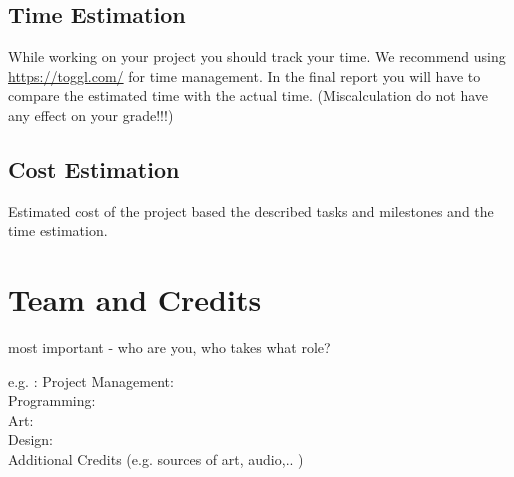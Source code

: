 \documentclass[a4paper]{scrreprt}
\begin{document}
\section{Time Estimation}

While working on your project you should track your time. 
We recommend using \url{https://toggl.com/} for time management. In the final report you will have to compare the estimated time with the actual time. (Miscalculation do not have any effect on your grade!!!)

\section{Cost Estimation}

Estimated cost of the project based the described tasks and milestones and the  time estimation.  



\chapter{Team and Credits}

most important - who are you, who takes what role? 

e.g. :
Project Management: \\
Programming: \\ 
Art: \\ 
Design: \\ 

Additional Credits (e.g. sources of art, audio,.. ) 


%
%
\end{document}
